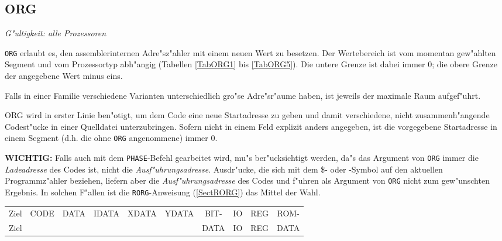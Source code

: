 \documentclass[12pt,a4paper,twoside]{report}
\makeatletter
\newcommand{\tty}[1]{{\tt #1}}
\newcommand{\tin}[1]{{\scriptsize #1}}
\newcommand{\ttindex}[1]{\index{#1@{\tt #1}}}
\makeatother
\begin{document}

\subsection{ORG}
\label{SectORG}\ttindex{ORG}

{\em G"ultigkeit: alle Prozessoren}

\tty{ORG} erlaubt es, den assemblerinternen Adre"sz"ahler mit einem neuen
Wert zu besetzen.  Der Wertebereich ist vom momentan gew"ahlten Segment
und vom Prozessortyp abh"angig (Tabellen \ref{TabORG1} bis \ref{TabORG5}).
Die untere Grenze ist dabei immer 0; die obere Grenze der angegebene Wert
minus eins.
\par
Falls in einer Familie verschiedene Varianten unterschiedlich
gro"se Adre"sr"aume haben, ist jeweils der maximale Raum aufgef"uhrt.
\par
ORG wird in erster Linie ben"otigt, um dem Code eine neue Startadresse
zu geben und damit verschiedene, nicht zusammenh"angende Codest"ucke in
einer Quelldatei unterzubringen.  Sofern nicht in einem Feld explizit anders
angegeben, ist die vorgegebene Startadresse in einem Segment (d.h. die ohne
{\tt ORG} angenommene) immer 0.
\par
{\bf WICHTIG:} Falls auch mit dem \tty{PHASE}-Befehl gearbeitet
wird, mu"s ber"ucksichtigt werden, da"s das Argument von \tty{ORG}
immer die {\em Ladeadresse} des Codes ist, nicht die {\em
Ausf"uhrungsadresse}.  Ausdr"ucke, die sich mit dem \$- oder
\*-Symbol auf den aktuellen Programmz"ahler beziehen, liefern
aber die {\em Ausf"uhrungsadresse} des Codes und f"uhren als
Argument von \tty{ORG} nicht zum gew"unschten Ergebnis.  In
solchen F"allen ist die \tty{RORG}-Anweisung (\ref{SectRORG}) das
Mittel der Wahl.
\begin{table*}[htbp]
\begin{center}\begin{tabular}{|l|c|c|c|c|c|c|c|c|c|}
\hline
\tin{Ziel} & \tin{CODE} & \tin{DATA} & \tin{IDATA} & \tin{XDATA} & \tin{YDATA} & \tin{BIT-} & \tin{IO} & \tin{REG} & \tin{ROM-} \\
\tin{Ziel} &            &            &             &             &             & \tin{DATA} & \tin{IO} & \tin{REG} & \tin{DATA} \\
\hline
\hline

\hline
\end{tabular}\end{center}
\caption{Adre"sbereiche f"ur \tty{ORG} --- Teil 1\label{TabORG1}}
\end{table*}
\end{document}
